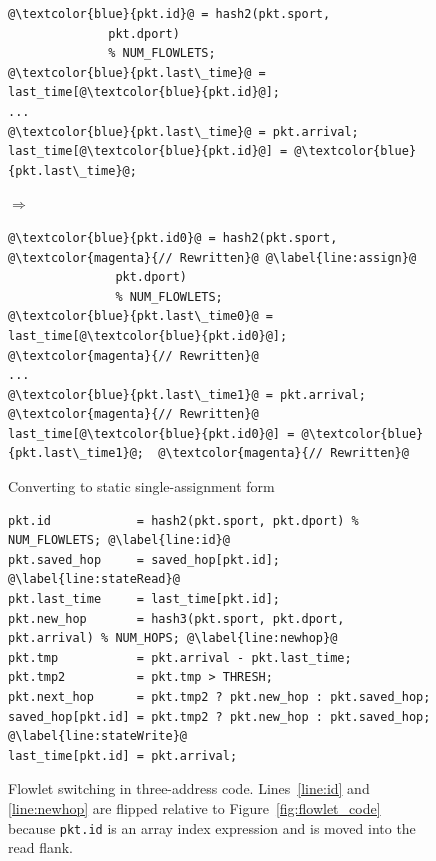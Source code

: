 \begin{figure}[!t]
  \begin{minipage}{\textwidth}
  \begin{minipage}{0.4\textwidth}
  \begin{small}
  \begin{lstlisting}[style=customc, numbers=none, frame=none]
@\textcolor{blue}{pkt.id}@ = hash2(pkt.sport,
              pkt.dport)
              % NUM_FLOWLETS;
@\textcolor{blue}{pkt.last\_time}@ = last_time[@\textcolor{blue}{pkt.id}@];
...
@\textcolor{blue}{pkt.last\_time}@ = pkt.arrival;
last_time[@\textcolor{blue}{pkt.id}@] = @\textcolor{blue}{pkt.last\_time}@;
  \end{lstlisting}
  \end{small}
  \end{minipage}
  $\Longrightarrow$
  \hspace{-0.2in}
%
  \begin{minipage}{0.6\textwidth}
  \begin{small}
  \begin{lstlisting}[style=customc, numbers=none, frame=none]
@\textcolor{blue}{pkt.id0}@ = hash2(pkt.sport,          @\textcolor{magenta}{// Rewritten}@ @\label{line:assign}@
               pkt.dport)
               % NUM_FLOWLETS;  
@\textcolor{blue}{pkt.last\_time0}@ = last_time[@\textcolor{blue}{pkt.id0}@];  @\textcolor{magenta}{// Rewritten}@
...
@\textcolor{blue}{pkt.last\_time1}@ = pkt.arrival;        @\textcolor{magenta}{// Rewritten}@
last_time[@\textcolor{blue}{pkt.id0}@] = @\textcolor{blue}{pkt.last\_time1}@;  @\textcolor{magenta}{// Rewritten}@
  \end{lstlisting}
  \end{small}
  \end{minipage}
  \caption[title]{Converting to static single-assignment form}
  \label{fig:ssa}
\end{minipage}
\end{figure}


\begin{figure}[!t]
\begin{minipage}{\textwidth}
\begin{lstlisting}[style=customc]
pkt.id            = hash2(pkt.sport, pkt.dport) % NUM_FLOWLETS; @\label{line:id}@
pkt.saved_hop     = saved_hop[pkt.id]; @\label{line:stateRead}@
pkt.last_time     = last_time[pkt.id];
pkt.new_hop       = hash3(pkt.sport, pkt.dport, pkt.arrival) % NUM_HOPS; @\label{line:newhop}@
pkt.tmp           = pkt.arrival - pkt.last_time;
pkt.tmp2          = pkt.tmp > THRESH;
pkt.next_hop      = pkt.tmp2 ? pkt.new_hop : pkt.saved_hop;
saved_hop[pkt.id] = pkt.tmp2 ? pkt.new_hop : pkt.saved_hop; @\label{line:stateWrite}@
last_time[pkt.id] = pkt.arrival;
\end{lstlisting}
\caption[title2]{Flowlet switching in three-address
code. Lines~\ref{line:id} and \ref{line:newhop} are flipped relative
to Figure~\ref{fig:flowlet_code} because {\tt pkt.id} is an array index expression and is
moved into the read flank.}
\label{fig:three_address}
\end{minipage}
\vspace{-0.3cm}
\end{figure}

